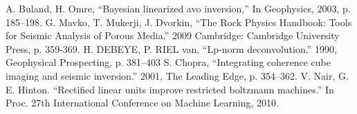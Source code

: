 \documentclass[conference,compsoc]{IEEEtran}
\begin{document}
\begin{thebibliography}{1}
		A. Buland,  H. Omre, ``Bayesian linearized avo inversion,'' In Geophysics, 2003, p. 185–198.
		G. Mavko, T. Mukerji, J. Dvorkin, ``The Rock Physics Handbook: Tools for Seismic Analysis of Porous Media.'' 2009 Cambridge: Cambridge University Press, p. 359-369.
		H. DEBEYE, P. RIEL van, ``Lp-norm deconvolution.'' 1990, Geophysical Prospecting, p. 381–403
		S. Chopra, ``Integrating coherence cube imaging and seismic inversion.'' 2001, The Leading Edge, p. 354–362.
 			V. Nair, G. E. Hinton. ``Rectified linear units improve restricted boltzmann machines.'' In Proc. 27th International Conference on Machine Learning, 2010.
\end{thebibliography}



\end{document}
